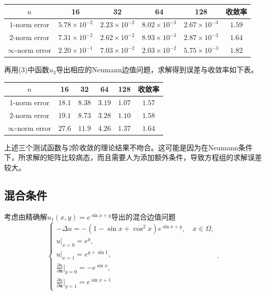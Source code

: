 \documentclass[lang=cn,11pt,a4paper]{elegantpaper}
\begin{document}
\begin{table}[H]
  \centering
  \begin{tabular}{c|cccc|c}
  \textbf{$n$}        & 16                   & 32                   & 64                   & 128                  & 收敛率 \\ \hline
  $1$-norm error      & $5.78\times 10^{-2}$ & $2.23\times 10^{-2}$ & $8.02\times 10^{-3}$ & $2.67\times 10^{-3}$ & $1.59$\\
  $2$-norm error      & $7.31\times 10^{-2}$ & $2.62\times 10^{-2}$ & $8.93\times 10^{-3}$ & $2.87\times 10^{-3}$ & $1.64$\\
  $\infty$-norm error & $2.20\times 10^{-1}$ & $7.03\times 10^{-2}$ & $2.03\times 10^{-2}$ & $5.75\times 10^{-3}$ & $1.82$
  \end{tabular}
\end{table}

再用(3)中函数$u_3$导出相应的Neumann边值问题，求解得到误差与收敛率如下表。

\begin{table}[H]
  \centering
  \begin{tabular}{c|cccc|c}
  \textbf{$n$}        & 16                   & 32                   & 64                   & 128                  & 收敛率 \\ \hline
  $1$-norm error      & $18.1$ & $8.38$ & $3.19$ & $1.07$ & $1.57$\\
  $2$-norm error      & $19.1$ & $8.73$ & $3.28$ & $1.10$ & $1.58$\\
  $\infty$-norm error & $27.6$ & $11.9$ & $4.26$ & $1.37$ & $1.64$
  \end{tabular}
\end{table}

上述三个测试函数与2阶收敛的理论结果不吻合。这可能是因为在Neumann条件下，所求解的矩阵比较病态，而且需要人为添加额外条件，导致方程组的求解误差较大。

\subsection{混合条件}

考虑由精确解$u_1(x,y)=e^{\sin x+y}$导出的混合边值问题
\begin{equation}
  \left\{
    \begin{array}{l}
      -\Delta u = -(1-\sin x+\cos^2 x)e^{\sin x + y},\quad x\in\Omega, \\
      u|_{x=0}=e^{y},\\
      u|_{x=1}=e^{y+\sin 1},\\
      \frac{\partial u}{\partial \mathbf{n}}|_{y=0}=-e^{\sin x},\\
      \frac{\partial u}{\partial \mathbf{n}}|_{y=1}=e^{\sin x+1}
    \end{array}
  \right. .
\end{equation}
\end{document}
